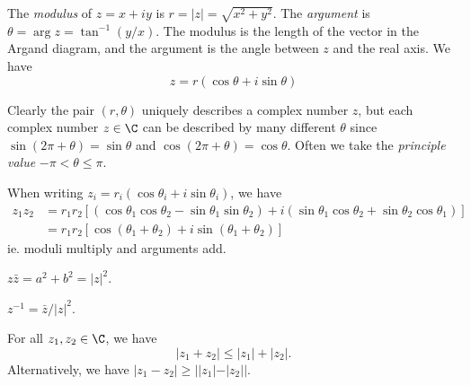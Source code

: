\documentclass[a4paper]{article}
\begin{document}
\begin{center}
\end{center}

\begin{defi}
  The \emph{modulus} of $z = x + iy$ is $r = |z| = \sqrt{x^2 + y^2}$. The \emph{argument} is $\theta = \arg z = \tan^{-1} (y/x)$. The modulus is the length of the vector in the Argand diagram, and the argument is the angle between $z$ and the real axis. We have
  \[
    z = r(\cos\theta + i\sin \theta)
  \]

  Clearly the pair $(r, \theta)$ uniquely describes a complex number $z$, but each complex number $z\in \C$ can be described by many different $\theta$ since $\sin (2\pi + \theta) = \sin \theta$ and $\cos(2\pi + \theta) = \cos\theta$. Often we take the \emph{principle value} $-\pi < \theta \leq \pi$.
\end{defi}

When writing $z_i = r_i(\cos\theta_i + i\sin \theta_i)$, we have
\begin{align*}
  z_1z_2 &= r_1r_2[(\cos\theta_1\cos\theta_2 - \sin\theta_1\sin\theta_2) + i(\sin\theta_1\cos\theta_2 + \sin\theta_2\cos\theta_1)]\\
  &= r_1r_2[\cos(\theta_1 + \theta_2) + i\sin(\theta_1+\theta_2)]
\end{align*}
ie. moduli multiply and arguments add.

\begin{prop}
  $z\bar{z} = a^2 + b^2 = |z|^2$.
\end{prop}

\begin{prop}
  $z^{-1} = \bar{z}/|z|^2$.
\end{prop}

\begin{thm}
  For all $z_1, z_2 \in \C$, we have
  \[
    |z_1 + z_2| \leq |z_1| + |z_2|.
  \]
  Alternatively, we have $|z_1 - z_2|\geq ||z_1| - |z_2||$.
\end{thm}
\end{document}
